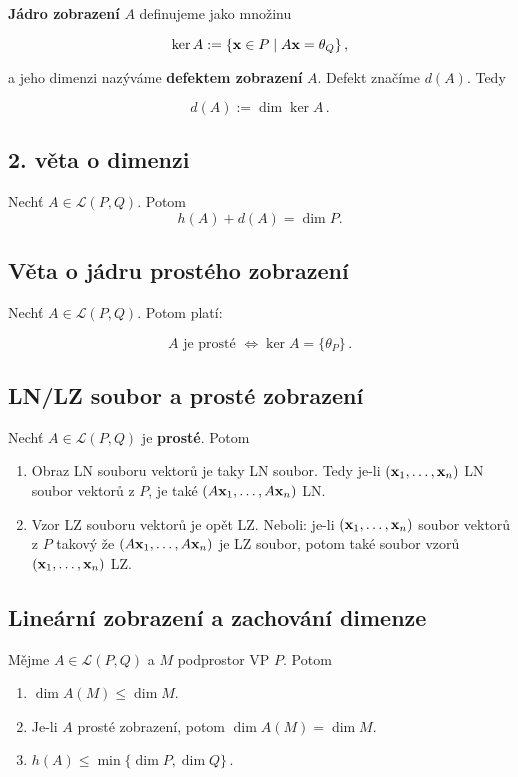 \noindent \textbf{Jádro zobrazení} $A$ definujeme jako množinu

\[ \ker A:=\{\mathbf{x}\in P\mid A\mathbf{x}=\theta_Q\}\,, \]

\noindent a jeho dimenzi nazýváme \textbf{defektem zobrazení} $A$. Defekt značíme $d(A)$. Tedy

\[ d(A):=\dim \ker A\,. \]

\subsection*{2. věta o dimenzi}

Nechť $A\in\mathcal L(P,Q)$. Potom
\[ h(A)+d(A)=\dim P. \]

\subsection*{Věta o jádru prostého zobrazení}

Nechť $A\in\mathcal L(P,Q)$. Potom platí:

\[ A\text{ je prosté }\Leftrightarrow \ker A=\{\theta_P\}\,. \]

\subsection*{LN/LZ soubor a prosté zobrazení}

Nechť $A\in\mathcal L(P,Q)$ je \textbf{prosté}. Potom

\begin{enumerate}
      \item Obraz LN souboru vektorů je taky LN soubor. Tedy je-li $(\mathbf{x}_1,\dots,\mathbf{x}_n)$ LN
            soubor vektorů z $P$, je také $(A\mathbf{x}_1,\dots,A\mathbf{x}_n)$ LN.
      \item Vzor LZ souboru vektorů je opět LZ. Neboli: je-li $(\mathbf{x}_1,\dots,\mathbf{x}_n)$ soubor
            vektorů z $P$ takový že $(A\mathbf{x}_1,\dots,A\mathbf{x}_n)$ je LZ soubor, potom také soubor
            vzorů $(\mathbf{x}_1,\dots,\mathbf{x}_n)$ LZ.
\end{enumerate}

\subsection*{Lineární zobrazení a zachování dimenze}

Mějme $A\in \mathcal L(P,Q)$ a $M$ podprostor VP $P$. Potom

\begin{enumerate}
      \item $\dim A(M) \leq \dim M$.
      \item Je-li $A$ prosté zobrazení, potom $\dim A(M) = \dim M$.
      \item $h(A)\leq \min \{\dim P, \dim Q\}\,.$
\end{enumerate}

\pagebreak
